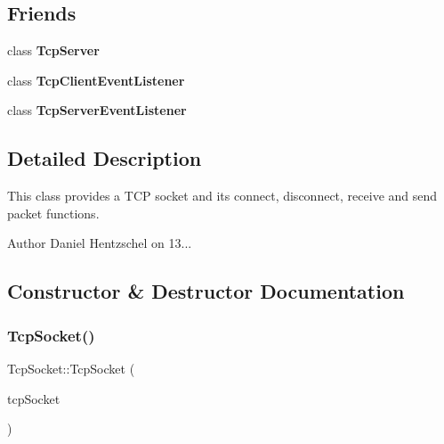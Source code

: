 \subsection*{Friends}
\begin{DoxyCompactItemize}
\item 
\mbox{\label{class_tcp_socket_a3ecf3132e8c4bf890c07853cfab7619c}} 
class {\bfseries Tcp\+Server}
\item 
\mbox{\label{class_tcp_socket_a2cb57636a27be761e0817237d9e5f938}} 
class {\bfseries Tcp\+Client\+Event\+Listener}
\item 
\mbox{\label{class_tcp_socket_afff21cc973310e3b55b9f25cd8d76bd0}} 
class {\bfseries Tcp\+Server\+Event\+Listener}
\end{DoxyCompactItemize}


\subsection{Detailed Description}
This class provides a T\+CP socket and its connect, disconnect, receive and send packet functions. 

\begin{DoxyAuthor}{Author}
Daniel Hentzschel on 13... 
\end{DoxyAuthor}


\subsection{Constructor \& Destructor Documentation}
\mbox{\label{class_tcp_socket_aac5a96f2ac3a824fb7c52260a6a6c2bd}} 
\subsubsection{\texorpdfstring{TcpSocket()}{TcpSocket()}\hspace{0.1cm}{\footnotesize\ttfamily [1/2]}}
{\footnotesize\ttfamily Tcp\+Socket\+::\+Tcp\+Socket (\begin{DoxyParamCaption}\item[{const \mbox{\hyperlink{class_tcp_socket}{Tcp\+Socket}} \&}]{tcp\+Socket }\end{DoxyParamCaption})}



